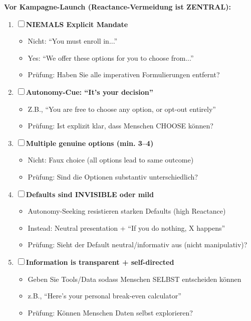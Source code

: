 \begin{tcolorbox}[colback=blue!5!white, colframe=blue!75!black, title=\textbf{Deployment Checklist: Autonomy-Seeking (KRITISCH!)}]

\textbf{Vor Kampagne-Launch (Reactance-Vermeidung ist ZENTRAL):}
\begin{enumerate}[label=\textbf{AS-\arabic*}]
\item ☐ \textbf{NIEMALS Explicit Mandate}
  \begin{itemize}[nosep]
  \item Nicht: ``You must enroll in...''
  \item Yes: ``We offer these options for you to choose from...''
  \item Prüfung: Haben Sie alle imperativen Formulierungen entfernt?
  \end{itemize}

\item ☐ \textbf{Autonomy-Cue: ``It's your decision''}
  \begin{itemize}[nosep]
  \item Z.B., ``You are free to choose any option, or opt-out entirely''
  \item Prüfung: Ist explizit klar, dass Menschen CHOOSE können?
  \end{itemize}

\item ☐ \textbf{Multiple genuine options (min. 3--4)}
  \begin{itemize}[nosep]
  \item Nicht: Faux choice (all options lead to same outcome)
  \item Prüfung: Sind die Optionen substantiv unterschiedlich?
  \end{itemize}

\item ☐ \textbf{Defaults sind INVISIBLE oder mild}
  \begin{itemize}[nosep]
  \item Autonomy-Seeking resistieren starken Defaults (high Reactance)
  \item Instead: Neutral presentation + ``If you do nothing, X happens''
  \item Prüfung: Sieht der Default neutral/informativ aus (nicht manipulativ)?
  \end{itemize}

\item ☐ \textbf{Information is transparent + self-directed}
  \begin{itemize}[nosep]
  \item Geben Sie Tools/Data sodass Menschen SELBST entscheiden können
  \item z.B., ``Here's your personal break-even calculator''
  \item Prüfung: Können Menschen Daten selbst explorieren?
  \end{itemize}


\end{enumerate}
\end{tcolorbox}

